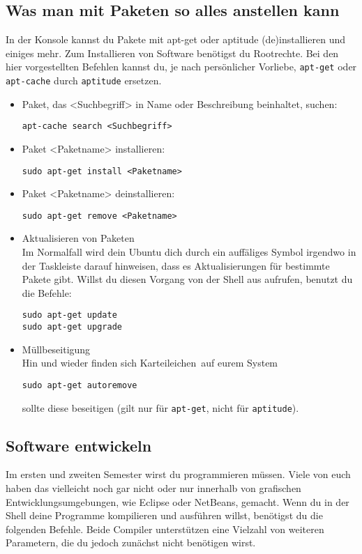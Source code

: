 \documentclass[a4paper,10pt]{article}
\begin{document}
\subsection{Was man mit Paketen so alles anstellen kann}
 In der Konsole kannst du Pakete mit apt-get oder aptitude (de)installieren 
und einiges mehr. Zum Installieren von Software benötigst du Rootrechte. 
Bei den hier vorgestellten Befehlen kannst du, je nach persönlicher Vorliebe,  
\texttt{apt-get} oder \texttt{apt-cache} durch \texttt{aptitude} ersetzen.
\begin{itemize}
\item Paket, das <Suchbegriff> in Name oder Beschreibung beinhaltet, suchen: 
\begin{lstlisting}
apt-cache search <Suchbegriff>
\end{lstlisting} 
\item Paket <Paketname> installieren:
\begin{lstlisting}
sudo apt-get install <Paketname>
\end{lstlisting} 
\item Paket <Paketname> deinstallieren:
\begin{lstlisting}
sudo apt-get remove <Paketname>
\end{lstlisting} 
\item Aktualisieren von Paketen \\
Im Normalfall wird dein Ubuntu dich durch ein auffäliges Symbol irgendwo 
in der Taskleiste darauf hinweisen, dass es Aktualisierungen für bestimmte 
Pakete gibt. Willst du diesen Vorgang von der Shell aus aufrufen, benutzt 
du die Befehle:
\begin{lstlisting}
sudo apt-get update
sudo apt-get upgrade
\end{lstlisting} 
\item Müllbeseitigung \\
Hin und wieder finden sich \glqq Karteileichen\grqq ~auf eurem System
\begin{lstlisting}
sudo apt-get autoremove
\end{lstlisting} 
sollte diese beseitigen (gilt nur für \texttt{apt-get}, nicht für \texttt{aptitude}).
\end{itemize}

\subsection{Software entwickeln}
Im ersten und zweiten Semester wirst du programmieren müssen. Viele von 
euch haben das vielleicht noch gar nicht oder nur innerhalb von grafischen
Entwicklungsumgebungen, wie Eclipse oder NetBeans, gemacht. Wenn du in 
der Shell deine Programme kompilieren und ausführen willst, benötigst du 
die folgenden Befehle. Beide Compiler unterstützen eine Vielzahl von
weiteren Parametern, die du jedoch zunächst nicht benötigen wirst.
\end{document}
